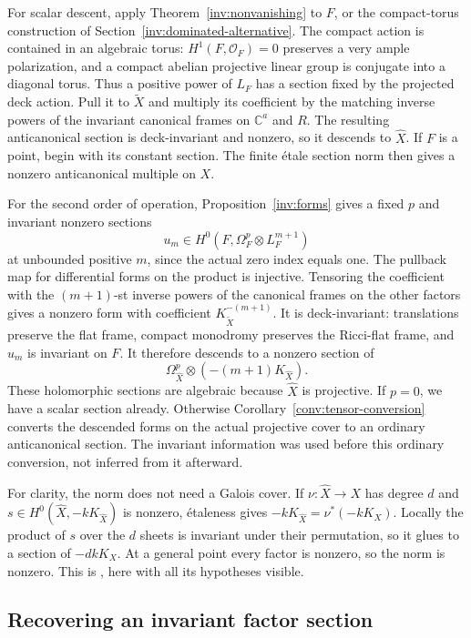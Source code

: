 For scalar descent, apply Theorem~\ref{inv:nonvanishing} to $F$,
or the compact-torus construction of
Section~\ref{inv:dominated-alternative}.  The compact action is
contained in an algebraic torus: $H^1(F,\mathcal O_F)=0$ preserves
a very ample polarization, and a compact abelian projective linear
group is conjugate into a diagonal torus.  Thus a positive power of
$L_F$ has a section fixed by the projected deck action.
Pull it to $\widetilde X$ and multiply its coefficient by the matching
inverse powers of the invariant canonical frames on $\mathbb C^a$
and $R$.  The resulting anticanonical section is deck-invariant and
nonzero, so it descends to $\widehat X$.  If $F$ is a point, begin
with its constant section.  The finite \'etale section norm then gives
a nonzero anticanonical multiple on $X$.

For the second order of operation, Proposition~\ref{inv:forms} gives a
fixed $p$ and invariant nonzero sections
\[
 u_m\in H^0(F,\Omega_F^p\otimes L_F^{m+1})
\]
at unbounded positive $m$, since the actual zero index equals one.
The pullback map for differential forms on the product is injective.
Tensoring the coefficient with the $(m+1)$-st inverse powers of the
canonical frames on the other factors gives a nonzero form with
coefficient $K_{\widetilde X}^{-(m+1)}$.  It is deck-invariant:
translations preserve the flat frame, compact monodromy preserves the
Ricci-flat frame, and $u_m$ is invariant on $F$.  It therefore descends
to a nonzero section of
\[
 \Omega_{\widehat X}^p\otimes(-(m+1)K_{\widehat X}).
\]
These holomorphic sections are algebraic because $\widehat X$ is
projective.  If $p=0$, we have a scalar section already.
Otherwise Corollary~\ref{conv:tensor-conversion} converts the descended
forms on the actual projective cover to an ordinary anticanonical
section.  The invariant information was used before this ordinary
conversion, not inferred from it afterward.

For clarity, the norm does not need a Galois cover.  If
$\nu:\widehat X\to X$ has degree $d$ and
$s\in H^0(\widehat X,-kK_{\widehat X})$ is nonzero, \'etaleness gives
$-kK_{\widehat X}=\nu^*(-kK_X)$.
Locally the product of $s$ over the $d$ sheets is invariant under their
permutation, so it glues to a section of $-dkK_X$.
At a general point every factor is nonzero, so the norm is nonzero.
This is \cite[Lemma~2.2]{CompanionH}, here with all
its hypotheses visible.

\subsection{Recovering an invariant factor section}

